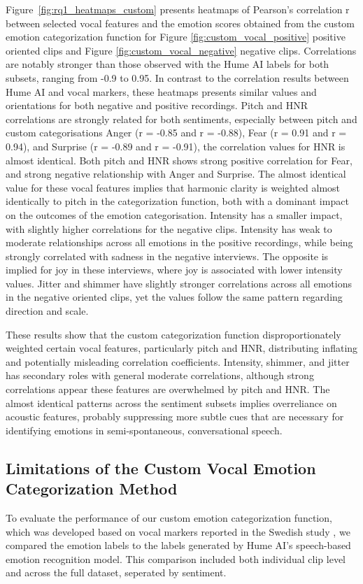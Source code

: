 Figure~\ref{fig:rq1_heatmaps_custom} presents heatmaps of Pearson’s correlation r between selected vocal features and the emotion scores obtained from the custom emotion categorization 
function for Figure \ref{fig:custom_vocal_positive} positive oriented clips and Figure \ref{fig:custom_vocal_negative} negative clips. Correlations are notably stronger than those observed with the Hume AI labels for both subsets, ranging from -0.9 to 0.95. 
In contrast to the correlation results between Hume AI and vocal markers, these heatmaps presents similar values and orientations for both negative and positive recordings. Pitch and HNR correlations are strongly related for both sentiments, especially between 
pitch and custom categorisations Anger (r = -0.85 and r = -0.88), Fear (r = 0.91 and r = 0.94), and Surprise (r = -0.89 and r = -0.91), the correlation values for HNR is almost identical. Both pitch and HNR shows strong positive correlation for Fear, and strong negative relationship with Anger and Surprise. The almost identical value for these vocal features implies that harmonic clarity is weighted almost identically to pitch in the categorization function, both with a dominant impact on the outcomes of the emotion categorisation. Intensity has a smaller impact, with slightly higher correlations for the negative clips. 
Intensity has weak to moderate relationships across all emotions in the positive recordings, while being strongly correlated with sadness in the negative interviews. The opposite is implied for joy in these interviews, where joy is associated with lower intensity values. 
Jitter and shimmer have slightly stronger correlations across all emotions in the negative oriented clips, yet the values follow the same pattern regarding direction and scale. 

\medskip
These results show that the custom categorization function disproportionately weighted certain vocal features, particularly pitch and HNR, distributing inflating and potentially misleading correlation coefficients. Intensity, shimmer, and jitter has secondary roles with general moderate correlations, although strong correlations appear these features are overwhelmed by pitch and HNR. The almost identical patterns across the sentiment subsets implies overreliance on acoustic features, probably suppressing more subtle cues that are necessary for identifying emotions in semi-spontaneous, conversational speech. 


\subsection{Limitations of the Custom Vocal Emotion Categorization Method}
To evaluate the performance of our custom emotion categorization function, which was developed based on vocal markers reported in the Swedish study \autocite{Ekberg2023}, we compared the emotion labels to the labels generated by Hume AI’s speech-based emotion recognition model. This comparison included both individual clip level and across the full dataset, seperated by sentiment. 


